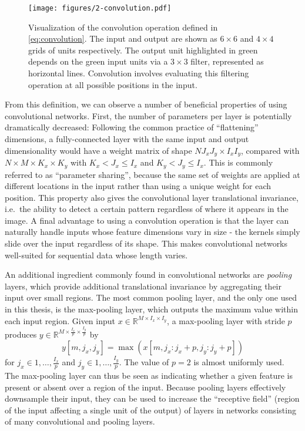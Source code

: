 \begin{figure}
  \centering
  \texttt{[image: figures/2-convolution.pdf]}
  \caption[Convolution operation]{Visualization of the convolution operation defined in \cref{eq:convolution}.
  The input and output are shown as $6 \times 6$ and $4 \times 4$ grids of units respectively.
  The output unit highlighted in green depends on the green input units via a $3 \times 3$ filter, represented as horizontal lines.
  Convolution involves evaluating this filtering operation at all possible positions in the input.}
  \label{fig:convolution}
\end{figure}

From this definition, we can observe a number of beneficial properties of using convolutional networks.
First, the number of parameters per layer is potentially dramatically decreased: Following the common practice of ``flattening'' dimensions, a fully-connected layer with the same input and output dimensionality would have a weight matrix of shape $NJ_xJ_y \times I_xI_y$, compared with $N \times M \times K_x \times K_y$ with $K_x < J_x \le I_x$ and $K_y < J_y \le I_x$.
This is commonly referred to as ``parameter sharing'', because the same set of weights are applied at different locations in the input rather than using a unique weight for each position.
This property also gives the convolutional layer translational invariance, i.e.\ the ability to detect a certain pattern regardless of where it appears in the image.
A final advantage to using a convolution operation is that the layer can naturally handle inputs whose feature dimensions vary in size - the kernels simply slide over the input regardless of its shape.
This makes convolutional networks well-suited for sequential data whose length varies.

An additional ingredient commonly found in convolutional networks are {\em pooling} layers, which provide additional translational invariance by aggregating their input over small regions.
The most common pooling layer, and the only one used in this thesis, is the max-pooling layer, which outputs the maximum value within each input region.
Given input $x \in \mathbb{R}^{M \times I_x \times I_y}$, a max-pooling layer with stride $p$ produces $y \in \mathbb{R}^{M \times \frac{I_x}{p} \times \frac{I_y}{p}}$ by
\begin{equation}
y[m, j_x, j_y] = \max(x[m, j_x:j_x + p, j_y:j_y + p])
\end{equation}
for $j_x \in 1, \ldots, \frac{I_x}{p}$ and $j_y \in 1, \ldots, \frac{I_y}{p}$.
The value of $p = 2$ is almost uniformly used.
The max-pooling layer can thus be seen as indicating whether a given feature is present or absent over a region of the input.
Because pooling layers effectively downsample their input, they can be used to increase the ``receptive field'' (region of the input affecting a single unit of the output) of layers in networks consisting of many convolutional and pooling layers.

